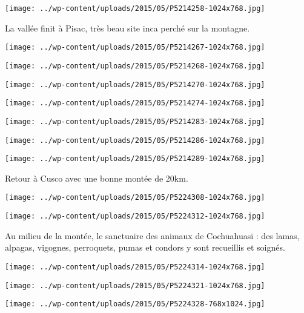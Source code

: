  \newline
\centerline{\texttt{[image: ../wp-content/uploads/2015/05/P5214258-1024x768.jpg]} } 
 \newline
 La vallée finit à Pisac, très beau site inca perché sur la montagne. \newline
 \newline
\centerline{\texttt{[image: ../wp-content/uploads/2015/05/P5214267-1024x768.jpg]} } 
 \newline
 \newline
\centerline{\texttt{[image: ../wp-content/uploads/2015/05/P5214268-1024x768.jpg]} } 
 \newline
 \newline
\centerline{\texttt{[image: ../wp-content/uploads/2015/05/P5214270-1024x768.jpg]} } 
 \newline
 \newline
\centerline{\texttt{[image: ../wp-content/uploads/2015/05/P5214274-1024x768.jpg]} } 
 \newline
 \newline
\centerline{\texttt{[image: ../wp-content/uploads/2015/05/P5214283-1024x768.jpg]} } 
 \newline
 \newline
\centerline{\texttt{[image: ../wp-content/uploads/2015/05/P5214286-1024x768.jpg]} } 
 \newline
 \newline
\centerline{\texttt{[image: ../wp-content/uploads/2015/05/P5214289-1024x768.jpg]} } 
 \newline
 Retour à Cusco avec une bonne montée de 20km. \newline
 \newline
\centerline{\texttt{[image: ../wp-content/uploads/2015/05/P5224308-1024x768.jpg]} } 
 \newline
 \newline
\centerline{\texttt{[image: ../wp-content/uploads/2015/05/P5224312-1024x768.jpg]} } 
 \newline
 Au milieu de la montée, le sanctuaire des animaux de Cochuahuasi : des lamas, alpagas, vigognes, perroquets, pumas et condors y sont recueillis et soignés. \newline
 \newline
\centerline{\texttt{[image: ../wp-content/uploads/2015/05/P5224314-1024x768.jpg]} } 
 \newline
 \newline
\centerline{\texttt{[image: ../wp-content/uploads/2015/05/P5224321-1024x768.jpg]} } 
 \newline
 \newline
\centerline{\texttt{[image: ../wp-content/uploads/2015/05/P5224328-768x1024.jpg]} } 

\newpage
 
